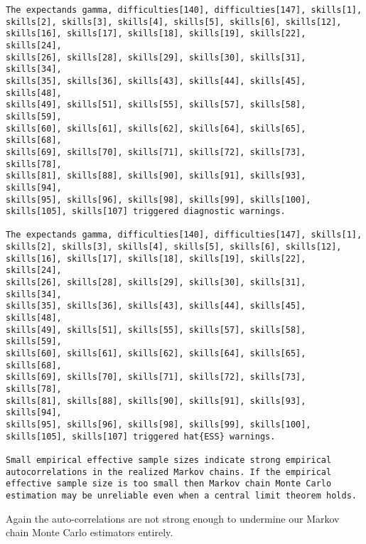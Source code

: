 \documentclass[
  letterpaper,
  DIV=11,
  numbers=noendperiod]{scrartcl}
\begin{document}
\begin{verbatim}
The expectands gamma, difficulties[140], difficulties[147], skills[1],
skills[2], skills[3], skills[4], skills[5], skills[6], skills[12],
skills[16], skills[17], skills[18], skills[19], skills[22], skills[24],
skills[26], skills[28], skills[29], skills[30], skills[31], skills[34],
skills[35], skills[36], skills[43], skills[44], skills[45], skills[48],
skills[49], skills[51], skills[55], skills[57], skills[58], skills[59],
skills[60], skills[61], skills[62], skills[64], skills[65], skills[68],
skills[69], skills[70], skills[71], skills[72], skills[73], skills[78],
skills[81], skills[88], skills[90], skills[91], skills[93], skills[94],
skills[95], skills[96], skills[98], skills[99], skills[100],
skills[105], skills[107] triggered diagnostic warnings.

The expectands gamma, difficulties[140], difficulties[147], skills[1],
skills[2], skills[3], skills[4], skills[5], skills[6], skills[12],
skills[16], skills[17], skills[18], skills[19], skills[22], skills[24],
skills[26], skills[28], skills[29], skills[30], skills[31], skills[34],
skills[35], skills[36], skills[43], skills[44], skills[45], skills[48],
skills[49], skills[51], skills[55], skills[57], skills[58], skills[59],
skills[60], skills[61], skills[62], skills[64], skills[65], skills[68],
skills[69], skills[70], skills[71], skills[72], skills[73], skills[78],
skills[81], skills[88], skills[90], skills[91], skills[93], skills[94],
skills[95], skills[96], skills[98], skills[99], skills[100],
skills[105], skills[107] triggered hat{ESS} warnings.

Small empirical effective sample sizes indicate strong empirical
autocorrelations in the realized Markov chains. If the empirical
effective sample size is too small then Markov chain Monte Carlo
estimation may be unreliable even when a central limit theorem holds.
\end{verbatim}

Again the auto-correlations are not strong enough to undermine our
Markov chain Monte Carlo estimators entirely.
\end{document}
